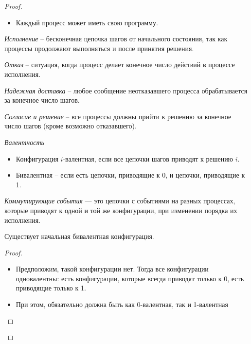 \begin{proof}
\begin{itemize}
        \item Каждый процесс может иметь свою программу.
    \end{itemize}
    \begin{definition}
        \textit{Исполнение} -- бесконечная цепочка шагов от начального состояния, 
        так как процессы продолжают выполняться и после принятия решения.
    \end{definition}
    \begin{definition}
        \textit{Отказ} -- ситуация, когда процесс делает конечное число действий в процессе исполнения.
    \end{definition}
    \begin{definition}
        \textit{Надежная доставка} -- любое сообщение неотказавшего процесса 
        обрабатывается за конечное число шагов.
    \end{definition}
    \begin{definition}
        \textit{Согласие и решение} -- все процессы должны прийти к решению за 
        конечное число шагов (кроме возможно отказавшего).
    \end{definition}
    \begin{definition}
        \textit{Валентность}
        \begin{itemize}
            \item Конфигурация $i$-валентная, если все цепочки шагов приводят к решению $i$.
            \item Бивалентная -- если есть цепочки, приводящие к 0, и цепочки, приводящие к 1.
        \end{itemize}
    \end{definition}
    \begin{definition}
        \textit{Коммутирующие события} --- это цепочки с событиями на разных процессах, 
        которые приводят к одной и той же конфигурации, при изменении порядка их исполнения.
    \end{definition}
    \begin{lemma} 
        Существует начальная бивалентная конфигурация.
    \end{lemma}
    \begin{proof} 
        \begin{itemize}
            \item Предположим, такой конфигурации нет. Тогда все конфигурации одновалентны:
                есть конфигурации, которые всегда приводят только к 0, есть приводящие только к 1.
            \item При этом, обязательно должна быть как 0-валентная, так и 1-валентная

\end{itemize}
\end{proof}
\end{proof}
